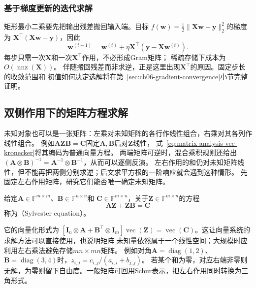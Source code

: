 \subsubsection{基于梯度更新的迭代求解}
\label{sec:linear-algebra-gradient-residual}

矩形最小二乘要先把输出残差搬回输入端。目标
$f(\bm w)=\tfrac12\lVert\bm X\bm w-\bm y\rVert_2^2$的梯度为
$\bm X^\top(\bm X\bm w-\bm y)$，因此
\begin{equation}
 \bm w^{(t+1)}
 =\bm w^{(t)}+\eta\bm X^\top(\bm y-\bm X\bm w^{(t)}).
 \label{eq:ch06-least-squares-gradient-update}
\end{equation}
每步只需一次$\bm X$和一次$\bm X^\top$作用，不必形成Gram矩阵；
稀疏存储下成本为$O(\operatorname{nnz}(\bm X))$。
伴随搬回残差而非求逆，正是这里出现$\bm X^\top$的原因。固定步长的收敛范围和
初值如何决定选解将在第~\ref{sec:ch06-gradient-convergence}小节完整证明。

\subsection{双侧作用下的矩阵方程求解}
\label{sec:linear-algebra-matrix-equations}

未知对象也可以是一张矩阵：左乘对未知矩阵的各行作线性组合，右乘对其各列作线性组合。
例如$\bm A\bm Z\bm B=\bm C$固定$\bm A,\bm B$后对$\bm Z$线性，
式~\eqref{eq:matrix-analysis-vec-kronecker}将其编码为普通向量方程。
两端矩阵可逆时，混合乘积规则还给出
$(\bm A\otimes\bm B)^{-1}=\bm A^{-1}\otimes\bm B^{-1}$，从而可以逐侧反演。
左右作用的和仍对未知矩阵线性，但不能再把两侧分别求逆；后文求平方根的一阶响应就会遇到这种情形。
先固定左右作用矩阵，研究它们能否唯一确定未知矩阵。

\begin{definition}[Sylvester方程]
\label{def:matrix-analysis-sylvester-equation}
给定$\bm A\in\mathbb F^{m\times m}$、$\bm B\in\mathbb F^{n\times n}$和
$\bm C\in\mathbb F^{m\times n}$，关于$\bm Z\in\mathbb F^{m\times n}$的方程
\[
 \bm A\bm Z+\bm Z\bm B=\bm C
\]
称为（Sylvester equation）。
\end{definition}
它的向量化形式为
$[\bm I_n\otimes\bm A+\bm B^\top\otimes\bm I_m]\operatorname{vec}(\bm Z)
=\operatorname{vec}(\bm C)$。这让向量系统的求解方法可以直接使用，也说明矩阵
未知量依然属于一个线性空间；大规模时应利用左右乘法避免存储$mn\times mn$矩阵。
例如对角$\bm A=\operatorname{diag}(1,2)$、
$\bm B=\operatorname{diag}(3,4)$时，$z_{i,j}=c_{i,j}/(a_{i,i}+b_{j,j})$。
若某个和为零，对应右端非零则无解，为零则留下自由度。一般矩阵可回用Schur表示，把左右作用同时转换为三角形式。


